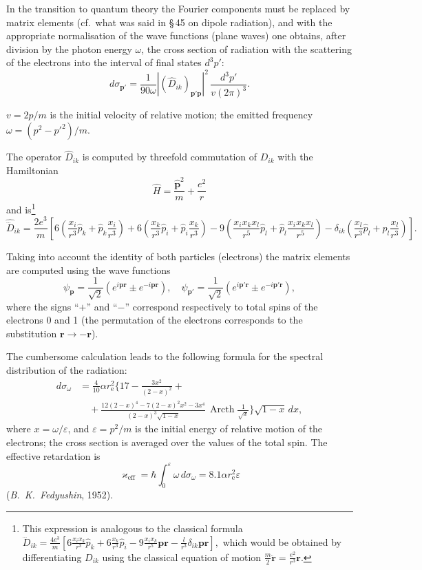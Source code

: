 In the transition to quantum theory the Fourier components must be replaced by matrix elements (cf.\ what was said in \S\,45 on dipole radiation), and with the appropriate normalisation of the wave functions (plane waves) one obtains, after division by the photon energy $\omega$, the cross section of radiation with the scattering of the electrons into the interval of final states $d^3p'$:
\[
d\sigma_{\mathbf{p}'} = \frac{1}{90\omega}|(\hat{D}_{ik})_{\mathbf{p}'\mathbf{p}}|^2\,\frac{d^3p'}{v(2\pi)^3}.
\]


$v = 2p/m$ is the initial velocity of relative motion; the emitted frequency $\omega = (p^2 - p'^2)/m$.

The operator $\hat{D}_{ik}$ is computed by threefold commutation of $D_{ik}$ with the Hamiltonian
\[
\hat{H} = \frac{\hat{\mathbf{p}}^2}{m} + \frac{e^2}{r}
\]
and is\footnote{This expression is analogous to the classical formula
$\dddot{D}_{ik} = \frac{4e^3}{m}\left[6\frac{x_i x_k}{r^3}\hat{p}_k + 6\frac{x_k}{r^3}\hat{p}_i - 9\frac{x_i x_k}{r^5}\mathbf{pr} - \frac{l}{r^3}\delta_{ik}\mathbf{pr}\right],$
which would be obtained by differentiating $D_{ik}$ using the classical equation of motion $\frac{m}{2}\ddot{\mathbf{r}} = \frac{e^2}{r^3}\mathbf{r}$.}
\[
\hat{\dddot{D}}_{ik} = \frac{2e^3}{m}\left[6\left(\frac{x_i}{r^3}\hat{p}_k + \hat{p}_k\frac{x_i}{r^3}\right) + 6\left(\frac{x_k}{r^3}\hat{p}_i + \hat{p}_i\frac{x_k}{r^3}\right) - 9\left(\frac{x_i x_k x_l}{r^5}\hat{p}_l + \hat{p}_l\frac{x_i x_k x_l}{r^5}\right) - \delta_{ik}\left(\frac{x_l}{r^3}\hat{p}_l + \hat{p}_l\frac{x_l}{r^3}\right)\right].
\]

Taking into account the identity of both particles (electrons) the matrix elements are computed using the wave functions
\[
\psi_\mathbf{p} = \frac{1}{\sqrt{2}}(e^{i\mathbf{pr}} \pm e^{-i\mathbf{pr}}), \quad \psi_{\mathbf{p}'} = \frac{1}{\sqrt{2}}(e^{i\mathbf{p}'\mathbf{r}} \pm e^{-i\mathbf{p}'\mathbf{r}}),
\]
where the signs ``$+$'' and ``$-$'' correspond respectively to total spins of the electrons 0 and 1 (the permutation of the electrons corresponds to the substitution $\mathbf{r} \to -\mathbf{r}$).

The cumbersome calculation leads to the following formula for the spectral distribution of the radiation:
\begin{align*}
d\sigma_\omega &= \frac{4}{10}\alpha r_\mathrm{e}^2\biggl\{17 - \frac{3x^2}{(2-x)^2} + {} \\
&\quad {} + \frac{12(2-x)^4 - 7(2-x)^2 x^2 - 3x^4}{(2-x)^3\sqrt{1-x}}\,\operatorname{Arcth}\frac{1}{\sqrt{x}}\biggr\}\sqrt{1-x}\,dx,
\end{align*}
where $x = \omega/\varepsilon$, and $\varepsilon = p^2/m$ is the initial energy of relative motion of the electrons; the cross section is averaged over the values of the total spin. The effective retardation is
\[
\varkappa_\text{eff} = \hbar\int_0^\varepsilon \omega\,d\sigma_\omega = 8.1\alpha r_\mathrm{e}^2\varepsilon
\]
(\emph{B.~K.~Fedyushin}, 1952).


